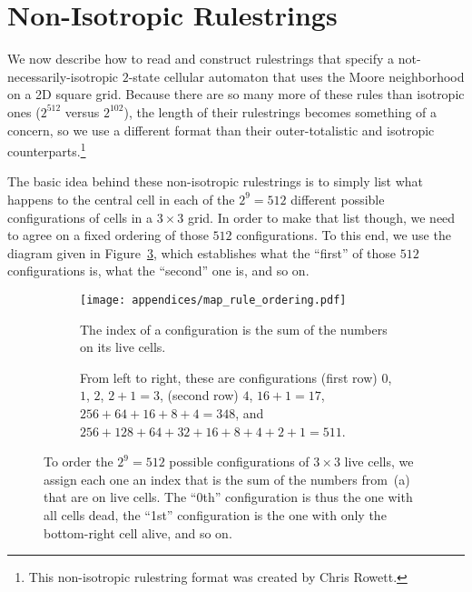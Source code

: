 \section{Non-Isotropic Rulestrings}\label{sec:non_isotropic_rulestrings}

We now describe how to read and construct rulestrings that specify a not-necessarily-isotropic $2$-state cellular automaton that uses the Moore neighborhood on a 2D square grid. Because there are so many more of these rules than isotropic ones ($2^{512}$ versus $2^{102}$), the length of their rulestrings becomes something of a concern, so we use a different format than their outer-totalistic and isotropic counterparts.\footnote{This non-isotropic rulestring format was created by Chris Rowett.}

The basic idea behind these non-isotropic rulestrings is to simply list what happens to the central cell in each of the $2^9 = 512$ different possible configurations of cells in a $3 \times 3$ grid. In order to make that list though, we need to agree on a fixed ordering of those $512$ configurations. To this end, we use the diagram given in Figure~\ref{fig:map_rule_ordering}, which establishes what the ``first'' of those $512$ configurations is, what the ``second'' one is, and so on.

\begin{figure}[!htbp]
	\centering
	\begin{subfigure}{.32\textwidth}
		\centering
		\texttt{[image: appendices/map\_rule\_ordering.pdf]}
		\caption{The index of a configuration is the sum of the numbers on its live cells.}
		\label{fig:map_rule_ordering_rule}
	\end{subfigure} \hfill \begin{subfigure}{.65\textwidth}
		\centering
		\caption{From left to right, these are configurations (first row) $0$, $1$, $2$, $2+1=3$, (second row) $4$, $16+1=17$, $256+64+16+8+4=348$, and $256+128+64+32+16+8+4+2+1=511$.}
		\label{fig:map_rule_ordering_eg}
	\end{subfigure}
	\caption{To order the $2^9 = 512$ possible configurations of $3 \times 3$ live cells, we assign each one an index that is the sum of the numbers from~(a) that are on live cells. The ``0th'' configuration is thus the one with all cells dead, the ``1st'' configuration is the one with only the bottom-right cell alive, and so on.}\label{fig:map_rule_ordering}
\end{figure}

